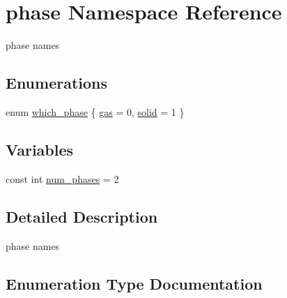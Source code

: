 \hypertarget{namespacephase}{}\section{phase Namespace Reference}
\label{namespacephase}


phase names  


\subsection*{Enumerations}
\begin{DoxyCompactItemize}
\item 
enum \hyperlink{namespacephase_a23c76f548a5eb1955ed8c929c541108b}{which\+\_\+phase} \{ \hyperlink{namespacephase_a23c76f548a5eb1955ed8c929c541108bad0a7c1eb8fd916c8b7ec85be0fd23b38}{gas} = 0, 
\hyperlink{namespacephase_a23c76f548a5eb1955ed8c929c541108bac0a46ca6c8cf218e8324eddc9518aeed}{solid} = 1
 \}
\end{DoxyCompactItemize}
\subsection*{Variables}
\begin{DoxyCompactItemize}
\item 
const int \hyperlink{namespacephase_ae6aa8f0634c0dc938684be3b754de921}{num\+\_\+phases} = 2
\end{DoxyCompactItemize}


\subsection{Detailed Description}
phase names 

\subsection{Enumeration Type Documentation}
